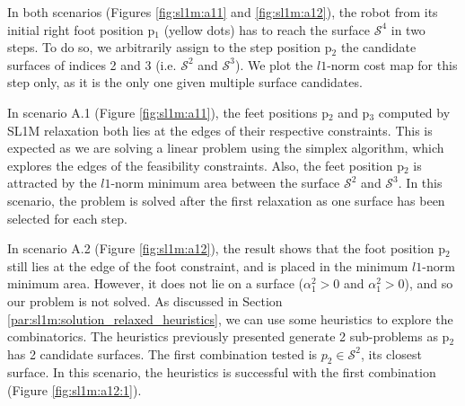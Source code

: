 In both scenarios (Figures \ref{fig:sl1m:a11} and \ref{fig:sl1m:a12}), the robot from its initial right foot position p$_1$ (yellow dots) has to reach the surface $\mathcal{S}^4$ in two steps. 
To do so, we arbitrarily assign to the step position p$_2$ the candidate surfaces of indices 2 and 3 (i.e. $\mathcal{S}^2$ and $\mathcal{S}^3$).
We plot the $l1$-norm cost map for this step only, as it is the only one given multiple surface candidates.

In scenario A.1 (Figure \ref{fig:sl1m:a11}), the feet positions p$_2$ and p$_3$ computed by SL1M relaxation both lies at the edges of their respective constraints. 
This is expected as we are solving a linear problem using the simplex algorithm, which explores the edges of the feasibility constraints.
Also, the feet position p$_2$ is attracted by the $l1$-norm minimum area between the surface $\mathcal{S}^2$ and $\mathcal{S}^3$. 
In this scenario, the problem is solved after the first relaxation as one surface has been selected for each step.

In scenario A.2 (Figure \ref{fig:sl1m:a12}), the result shows that the foot position p$_2$ still lies at the edge of the foot constraint, and is placed in the minimum $l1$-norm minimum area. 
However, it does not lie on a surface ($\alpha_1^2 > 0$ and $\alpha_1^2 > 0$), and so our problem is not solved.
As discussed in Section \ref{par:sl1m:solution_relaxed_heuristics}, we can use some heuristics to explore the combinatorics. 
The heuristics previously presented generate 2 sub-problems as p$_2$ has 2 candidate surfaces.
The first combination tested is $p_2 \in \mathcal{S}^2$, its closest surface.
In this scenario, the heuristics is successful with the first combination (Figure \ref{fig:sl1m:a12:1}).

